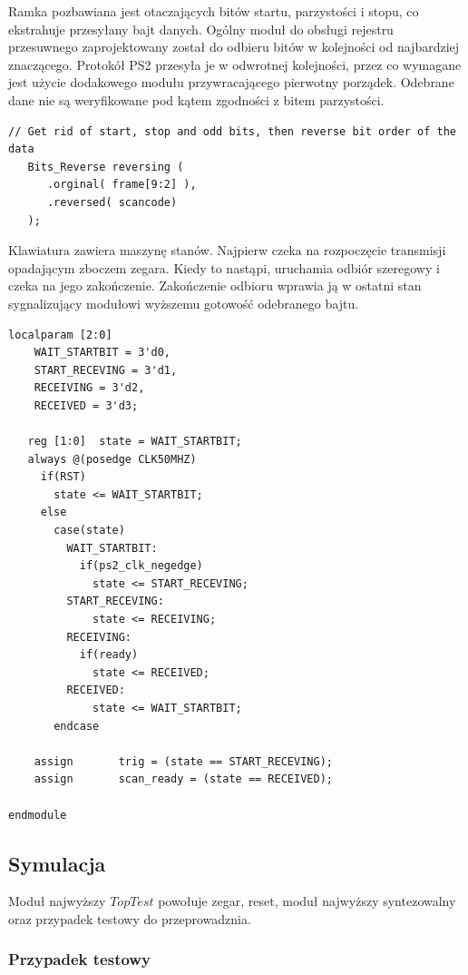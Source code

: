 \documentclass[a4paper,12pt]{article}
\begin{document}
Ramka pozbawiana jest otaczających bitów startu, parzystości i stopu, co ekstrahuje przesyłany bajt danych. Ogólny moduł do obsługi rejestru przesuwnego zaprojektowany został do odbieru bitów w kolejności od najbardziej znaczącego. Protokół PS2 przesyła je w odwrotnej kolejności, przez co wymagane jest użycie dodakowego modułu przywracającego pierwotny porządek. Odebrane dane nie są weryfikowane pod kątem zgodności z bitem parzystości.
\begin{lstlisting}[label=Keyboard,caption=Keyboard.v,firstnumber=36]
   // Get rid of start, stop and odd bits, then reverse bit order of the data
   Bits_Reverse reversing (
      .orginal( frame[9:2] ),
      .reversed( scancode)
   );
\end{lstlisting}

Klawiatura zawiera maszynę stanów. Najpierw czeka na rozpoczęcie transmisji opadającym zboczem zegara. Kiedy to nastąpi, uruchamia odbiór szeregowy i czeka na jego zakończenie. Zakończenie odbioru wprawia ją w ostatni stan sygnalizujący modułowi wyższemu gotowość odebranego bajtu.
\begin{lstlisting}[label=Keyboard,caption=Keyboard.v,firstnumber=42]
   localparam [2:0]
    WAIT_STARTBIT = 3'd0,
    START_RECEVING = 3'd1,
    RECEIVING = 3'd2,
    RECEIVED = 3'd3;

   reg [1:0]  state = WAIT_STARTBIT;
   always @(posedge CLK50MHZ)
     if(RST)
       state <= WAIT_STARTBIT;
     else
       case(state)
         WAIT_STARTBIT:
           if(ps2_clk_negedge)
             state <= START_RECEVING;
         START_RECEVING:
             state <= RECEIVING;
         RECEIVING:
           if(ready)
             state <= RECEIVED;
         RECEIVED:
             state <= WAIT_STARTBIT;
       endcase

    assign       trig = (state == START_RECEVING);
    assign       scan_ready = (state == RECEIVED);

endmodule
\end{lstlisting}


\subsection{Symulacja}

Moduł najwyższy $TopTest$ powołuje zegar, reset, moduł najwyższy syntezowalny oraz przypadek testowy do przeprowadznia.

\subsubsection{Przypadek testowy}
\end{document}
